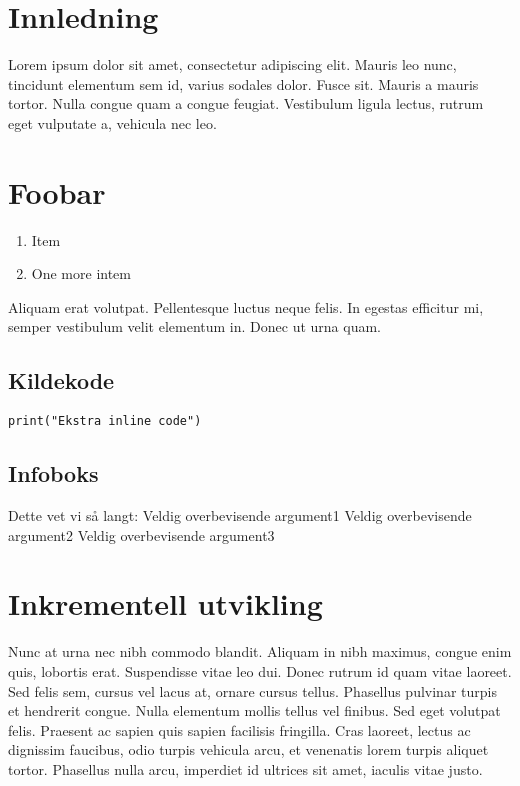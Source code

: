 
\section{Innledning}
Lorem ipsum dolor sit amet, consectetur adipiscing elit. Mauris leo nunc, tincidunt elementum sem id, varius sodales dolor. Fusce sit.
Mauris a mauris tortor. Nulla congue quam a congue feugiat. Vestibulum ligula lectus, rutrum eget vulputate a, vehicula nec leo.

\section{Foobar}
\begin{enumerate}
\item Item
\item One more intem
\end{enumerate}

Aliquam erat volutpat. Pellentesque luctus neque felis. In egestas efficitur mi, semper vestibulum velit elementum in. Donec ut urna quam.

\subsection{Kildekode}
\begin{lstlisting}[caption={Inline Programkode}, label=Kodesnutt_1, style=Python]
print("Ekstra inline code")
\end{lstlisting}




\subsection{Infoboks}
\begin{infoboks}{Dette vet vi så langt:}
Veldig overbevisende argument1
Veldig overbevisende argument2
Veldig overbevisende argument3
\end{infoboks}



\section{Inkrementell utvikling}
Nunc at urna nec nibh commodo blandit. Aliquam in nibh maximus, congue enim quis, lobortis erat. Suspendisse vitae leo dui. Donec rutrum id quam vitae laoreet. Sed felis sem, cursus vel lacus at, ornare cursus tellus. Phasellus pulvinar turpis et hendrerit congue. Nulla elementum mollis tellus vel finibus. Sed eget volutpat felis. Praesent ac sapien quis sapien facilisis fringilla. Cras laoreet, lectus ac dignissim faucibus, odio turpis vehicula arcu, et venenatis lorem turpis aliquet tortor. Phasellus nulla arcu, imperdiet id ultrices sit amet, iaculis vitae justo.


